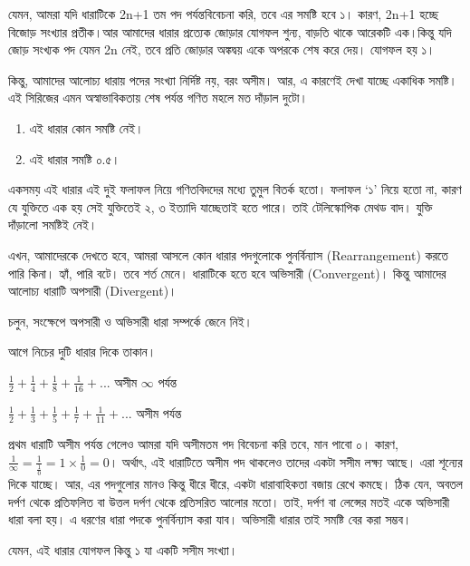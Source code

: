 \documentclass[
]{book}
\providecommand{\tightlist}{%
  \setlength{\itemsep}{0pt}\setlength{\parskip}{0pt}}
\begin{document}
যেমন, আমরা যদি ধারাটিকে 2n+1 তম পদ পর্যন্তবিবেচনা করি, তবে এর সমষ্টি হবে ১। কারণ, 2n+1 হচ্ছে বিজোড় সংখ্যার প্রতীক।আর আমাদের ধারার প্রত্যেক জোড়ার যোগফল শুন্য, বাড়তি থাকে আরেকটি এক।কিন্তু যদি জোড় সংখ্যক পদ যেমন 2n নেই, তবে প্রতি জোড়ার অঙ্কদ্বয় একে অপরকে শেষ করে দেয়। যোগফল হয় ১।

কিন্তু, আমাদের আলোচ্য ধারায় পদের সংখ্যা নির্দিষ্ট নয়, বরং অসীম। আর, এ কারণেই দেখা যাচ্ছে একাধিক সমষ্টি।
এই সিরিজের এমন অস্বাভাবিকতায় শেষ পর্যন্ত গণিত মহলে মত দাঁড়াল দুটো।

\begin{enumerate}
\def\labelenumi{\arabic{enumi}.}
\tightlist
\item
  এই ধারার কোন সমষ্টি নেই।
\item
  এই ধারার সমষ্টি ০.৫।
\end{enumerate}

একসময় এই ধারার এই দুই ফলাফল নিয়ে গণিতবিদদের মধ্যে তুমুল বিতর্ক হতো। ফলাফল `১' নিয়ে হতো না, কারণ যে যুক্তিতে এক হয় সেই যুক্তিতেই ২, ৩ ইত্যাদি যাচ্ছেতাই হতে পারে। তাই টেলিস্কোপিক মেথড বাদ। যুক্তি দাঁড়ালো সমষ্টিই নেই।

এখন, আমাদেরকে দেখতে হবে, আমরা আসলে কোন ধারার পদগুলোকে পুনর্বিন্যাস (Rearrangement) করতে পারি কিনা। হ্যাঁ, পারি বটে। তবে শর্ত মেনে। ধারাটিকে হতে হবে অভিসারী (Convergent)। কিন্তু আমাদের আলোচ্য ধারাটি অপসারী (Divergent)।

চলুন, সংক্ষেপে অপসারী ও অভিসারী ধারা সম্পর্কে জেনে নিই।

আগে নিচের দুটি ধারার দিকে তাকান।

\(\frac 1 2 + \frac 1 4 + \frac 1 8 + \frac 1 {16} + ...\) অসীম \(\infty\) পর্যন্ত

\(\frac 1 2 + \frac 1 3 + \frac 1 5 + \frac 1 7 + \frac 1 {11} + ...\) অসীম পর্যন্ত

প্রথম ধারাটি অসীম পর্যন্ত গেলেও আমরা যদি অসীমতম পদ বিবেচনা করি তবে, মান পাবো ০। কারণ, \(\frac{1}{\infty}=\frac 1 {\frac{1}{0}}=1 \times \frac{1}{0}=0\)। অর্থাৎ, এই ধারাটিতে অসীম পদ থাকলেও তাদের একটা সসীম লক্ষ্য আছে। এরা শূন্যের দিকে যাচ্ছে। আর, এর পদগুলোর মানও কিন্তু ধীরে ধীরে, একটা ধারাবাহিকতা বজায় রেখে কমছে। ঠিক যেন, অবতল দর্পণ থেকে প্রতিফলিত বা উত্তল দর্পণ থেকে প্রতিসরিত আলোর মতো। তাই, দর্পণ বা লেন্সের মতই একে অভিসারী ধারা বলা হয়। এ ধরণের ধারা পদকে পুনর্বিন্যাস করা যাব। অভিসারী ধারার তাই সমষ্টি বের করা সম্ভব।

যেমন, এই ধারার যোগফল কিন্তু ১ যা একটি সসীম সংখ্যা।
\end{document}
